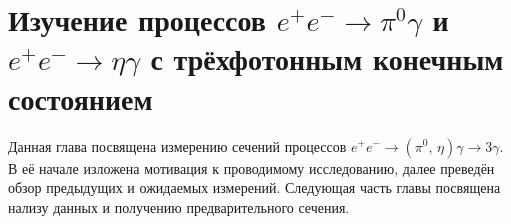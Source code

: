 \section{Изучение процессов \texorpdfstring{$e^+ e^- \to \pi^0 \gamma$}{e+ e- --> pi0 gamma} и \texorpdfstring{$e^+ e^- \to \eta \gamma$}{e+ e- --> eta gamma} с трёхфотонным конечным состоянием}


Данная глава посвящена измерению сечений процессов $e^+ e^- \to ( \pi^0, \, \eta ) \gamma \to 3 \gamma$.
В её начале изложена мотивация к проводимому исследованию,
далее преведён обзор предыдущих и ожидаемых измерений.
Следующая часть главы посвящена нализу данных и получению предварительного сечения.











